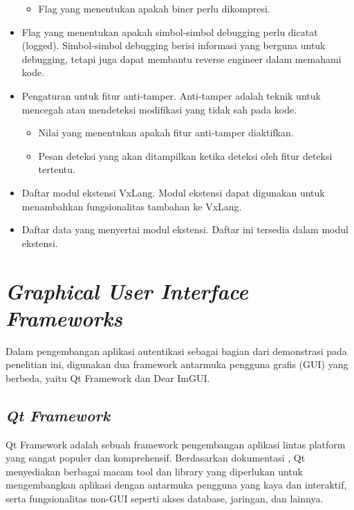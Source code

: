\begin{itemize}
\begin{itemize}
		      \item {} Flag yang menentukan apakah biner perlu dikompresi.
	      \end{itemize}
	\item {} Flag yang menentukan apakah simbol-simbol debugging perlu dicatat (logged). Simbol-simbol debugging berisi informasi yang berguna untuk debugging, tetapi juga dapat membantu reverse engineer dalam memahami kode.
	\item {} Pengaturan untuk fitur anti-tamper. Anti-tamper adalah teknik untuk mencegah atau mendeteksi modifikasi yang tidak sah pada kode.
	      \begin{itemize}
		      \item {} Nilai yang menentukan apakah fitur anti-tamper diaktifkan.
		      \item {} Pesan deteksi yang akan ditampilkan ketika deteksi oleh fitur deteksi tertentu.
	      \end{itemize}
	\item {} Daftar modul ekstensi VxLang. Modul ekstensi dapat digunakan untuk menambahkan fungsionalitas tambahan ke VxLang.
	\item {} Daftar data yang menyertai modul ekstensi. Daftar ini tersedia dalam modul ekstensi.
\end{itemize}

\section{\textit{Graphical User Interface Frameworks}}
Dalam pengembangan aplikasi autentikasi sebagai bagian dari demonstrasi pada penelitian ini, digunakan dua framework antarmuka pengguna grafis (GUI) yang berbeda, yaitu Qt Framework dan Dear ImGUI.

\subsection{\textit{Qt Framework}}
Qt Framework adalah sebuah framework pengembangan aplikasi lintas platform yang sangat populer dan komprehensif. Berdasarkan dokumentasi \cite{Qt}, Qt menyediakan berbagai macam tool dan library yang diperlukan untuk mengembangkan aplikasi dengan antarmuka pengguna yang kaya dan interaktif, serta fungsionalitas non-GUI seperti akses database, jaringan, dan lainnya.

